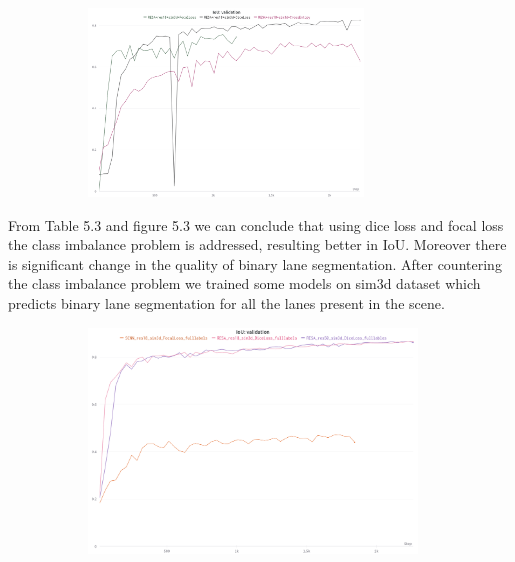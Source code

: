      \begin{figure}[h]
       \caption{IoU for binary lane segmentation trained on sim3D dataset with cross entropy, dice and focal loss.}
        \centering
        \begin{subfigure}{0.6\textwidth}
        \includegraphics[width=1\linewidth, height=5cm]{images/binseg_IOU.png} 
        \label{fig:subim1}
        \end{subfigure}
        \end{figure}
    
    From Table 5.3 and figure 5.3 we can conclude that using dice loss and focal loss the class imbalance problem is addressed, resulting better in IoU. Moreover there is significant change in the quality of binary lane segmentation.
        After countering the class imbalance problem we trained some models on sim3d dataset which predicts binary lane segmentation for all the lanes present in the scene.
        
        \begin{figure}[h]
       \caption{IoU for binary lane segmentation trained on sim3D dataset with cross entropy, dice and focal loss.}
        \centering
        \begin{subfigure}{0.6\textwidth}
        \includegraphics[width=1\linewidth, height=6cm]{images/IOU_full.png} 
        \label{fig:subim1}
        \end{subfigure}
        \end{figure}
           
